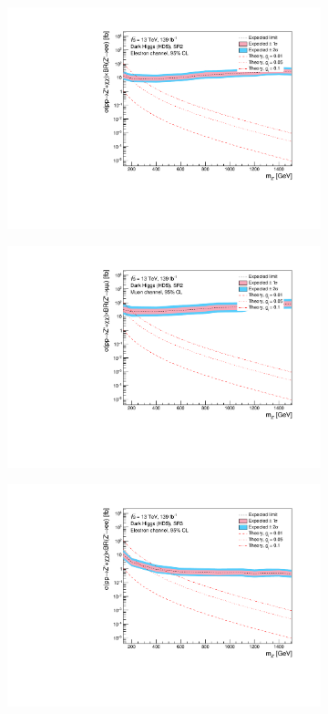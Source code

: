 \documentclass[12pt, a4paper]{book}
\begin{document}
\begin{figure}[!ht]
\begin{subfigure}[b]{0.49\textwidth}
      \includegraphics[width=1\textwidth]{Limits/Model_independent/100-150/DH_HDS/mass_exclusion_ee.pdf}
   \end{subfigure}
   \hfill
   \begin{subfigure}[b]{0.49\textwidth}
      \centering
      \includegraphics[width=1\textwidth]{Limits/Model_independent/100-150/DH_HDS/mass_exclusion_uu.pdf}
   \end{subfigure}
   \hfill
	\begin{subfigure}[b]{0.49\textwidth}
      \centering
      \includegraphics[width=1\textwidth]{Limits/Model_independent/150/DH_HDS/mass_exclusion_ee.pdf}

\end{subfigure}
\end{figure}
\end{document}
